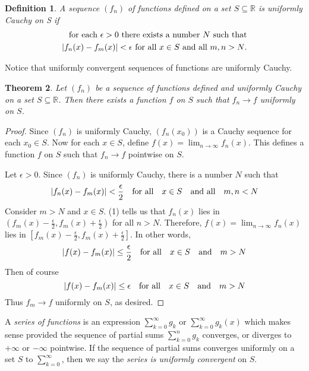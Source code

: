 \documentclass[12pt, lettersize]{book}
\newtheorem{thm}{Theorem}[section]
\newtheorem{dfn}[thm]{Definition}
\newcommand{\R}{\mathbb{R}}
\begin{document}
	\begin{dfn}
		A sequence $(f_n)$ of functions defined on a set $S\subseteq\R$ is \emph{uniformly Cauchy on S} if
		\begin{align*}
			\text{for each $\epsilon>0$ there exists a number $N$ such that}\\
			\text{$\abs{f_n(x)-f_m(x)}<\epsilon$ for all $x\in S$ and all $m,n>N$.}
		\end{align*}
	\end{dfn}
	Notice that uniformly convergent sequences of functions are uniformly Cauchy.
	
	\setcounter{equation}{0}
	\begin{thm}\label{thm:25.4}
		Let $(f_n)$ be a sequence of functions defined and uniformly Cauchy on a set $S\subseteq\R$. Then there exists a function $f$ on $S$ such that $f_n\rightarrow f$ uniformly on $S$.
	\end{thm}
	\begin{proof}
		Since $(f_n)$ is uniformly Cauchy, $(f_n(x_0))$ is a Cauchy sequence for each $x_0\in S$. Now for each $x\in S$, define $f(x)=\lim_{n\rightarrow\infty}f_n(x)$. This defines a function $f$ on $S$ such that $f_n\rightarrow f$ pointwise on $S$.
		
		Let $\epsilon>0$. Since $(f_n)$ is uniformly Cauchy, there is a number $N$ such that 
		\begin{equation}
			\abs{f_n(x)-f_m(x)}<\frac{\epsilon}{2}\quad\text{for all}\quad x\in S\quad\text{and all}\quad m,n<N
		\end{equation}
		Consider $m>N$ and $x\in S$. (1) tells us that $f_n(x)$ lies in $(f_m(x)-\frac{\epsilon}{2},f_m(x)+\frac{\epsilon}{2})$ for all $n>N$. Therefore, $f(x)=\lim_{n\rightarrow \infty}f_n(x)$ lies in $[f_m(x)-\frac{\epsilon}{2},f_m(x)+\frac{\epsilon}{2}]$. In other words,
		\begin{displaymath}
			\abs{f(x)-f_m(x)}\leq\frac{\epsilon}{2}\quad\text{for all}\quad x\in S\quad\text{and}\quad m>N
		\end{displaymath}
		Then of course
		\begin{displaymath}
			\abs{f(x)-f_m(x)}\leq\epsilon\quad\text{for all}\quad x\in S\quad\text{and}\quad m>N
		\end{displaymath}
		Thus $f_m\rightarrow f$ uniformly on $S$, as desired.
	\end{proof}
	
	A \emph{series of functions} is an expression $\sum_{k=0}^{\infty}g_k$ or $\sum_{k=0}^{\infty}g_k(x)$ which makes sense provided the sequence of partial sums $\sum_{k=0}^{n}g_k$ converges, or diverges to $+\infty$ or $-\infty$ pointwise. If the sequence of partial sums converges uniformly on a set $S$ to $\sum_{k=0}^{\infty}$, then we say the \emph{series is uniformly convergent} on $S$.
	
\end{document}
